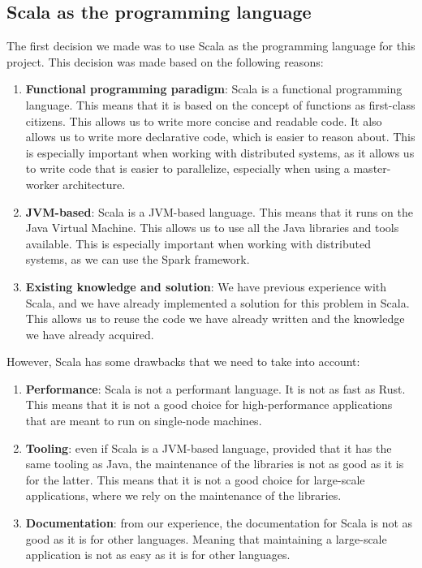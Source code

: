 \subsection{Scala as the programming language}

The first decision we made was to use Scala as the programming language for this project. This decision was made based on the following reasons:

\begin{enumerate}
    \itemsep0.5em
    \item \textbf{Functional programming paradigm}: Scala is a functional programming language. This means that it is based on the concept of functions as first-class citizens. This allows us to write more concise and readable code. It also allows us to write more declarative code, which is easier to reason about. This is especially important when working with distributed systems, as it allows us to write code that is easier to parallelize, especially when using a master-worker architecture.
    \item \textbf{JVM-based}: Scala is a JVM-based language. This means that it runs on the Java Virtual Machine. This allows us to use all the Java libraries and tools available. This is especially important when working with distributed systems, as we can use the Spark framework.
    \item \textbf{Existing knowledge and solution}: We have previous experience with Scala, and we have already implemented a solution for this problem in Scala. This allows us to reuse the code we have already written and the knowledge we have already acquired.
\end{enumerate}

However, Scala has some drawbacks that we need to take into account:

\begin{enumerate}
    \itemsep0.5em
    \item \textbf{Performance}: Scala is not a performant language. It is not as fast as Rust. This means that it is not a good choice for high-performance applications that are meant to run on single-node machines.
    \item \textbf{Tooling}: even if Scala is a JVM-based language, provided that it has the same tooling as Java, the maintenance of the libraries is not as good as it is for the latter. This means that it is not a good choice for large-scale applications, where we rely on the maintenance of the libraries.
    \item \textbf{Documentation}: from our experience, the documentation for Scala is not as good as it is for other languages. Meaning that maintaining a large-scale application is not as easy as it is for other languages.
\end{enumerate}

